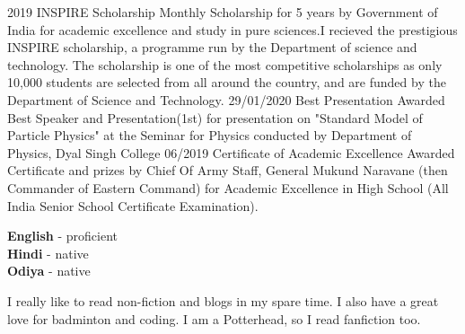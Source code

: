 \documentclass[9pt]{developercv} %
\begin{document}


\begin{entrylist}
	\entry
		{2019}
		{INSPIRE Scholarship}
		{}
		{Monthly Scholarship for 5 years by Government of India for academic excellence and study in pure sciences.I recieved the prestigious INSPIRE scholarship, a programme run by the Department of science and technology. The scholarship is one of the most competitive scholarships as only 10,000 students are selected from all around the country, and are funded by the Department of Science and Technology.}
	\entry
		{29/01/2020}
		{Best Presentation}
		{}
		{Awarded Best Speaker and Presentation(1st) for presentation on "Standard Model of Particle Physics" at the Seminar for Physics conducted by Department of Physics, Dyal Singh College}
	\entry
		{06/2019}
		{Certificate of Academic Excellence}
		{}
		{Awarded Certificate and prizes by Chief Of Army Staff, General Mukund Naravane (then Commander of Eastern Command) for Academic Excellence in High School (All India Senior School Certificate Examination).}
\end{entrylist}




\begin{minipage}[t]{0.5\textwidth}
	\vspace{-\baselineskip} %

	
	\textbf{English} - proficient\\
	\textbf{Hindi} - native\\
	\textbf{Odiya} - native
\end{minipage}
\hfill
\begin{minipage}[t]{0.5\textwidth}
	\vspace{-\baselineskip} %
	
	
	I really like to read non-fiction and blogs in my spare time. I also have a great love for badminton and coding. I am a Potterhead, so I read fanfiction too.  
\end{minipage}
	
\end{document}
